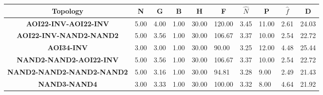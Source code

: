 \documentclass[conference]{IEEEtran}
\begin{document}
\begin{table*}[t]
\center
\begin{tabular}{|c|l|l|l|l|l|l|l|l|l|}
\hline
\textbf{Topology}                & \multicolumn{1}{c|}{\textbf{N}} & \multicolumn{1}{c|}{\textbf{G}} & \multicolumn{1}{c|}{\textbf{B}} & \multicolumn{1}{c|}{\textbf{H}} & \multicolumn{1}{c|}{\textbf{F}} & \multicolumn{1}{c|}{\boldmath$\hat{N}$} & \multicolumn{1}{c|}{\textbf{P}} & \multicolumn{1}{c|}{\boldmath$\hat{f}$} & \multicolumn{1}{c|}{\textbf{D}} \\ \hline
\textbf{AOI22-INV-AOI22-INV}     & 5.00                            & 4.00                            & 1.00                            & 30.00                           & 120.00                          & 3.45                               & 11.00                           & 2.61                               & 24.03                           \\ \hline
\textbf{AOI22-INV-NAND2-NAND2}   & 5.00                            & 3.56                            & 1.00                            & 30.00                           & 106.67                          & 3.37                               & 10.00                           & 2.54                               & 22.72                           \\ \hline
\textbf{AOI34-INV}               & 3.00                            & 3.00                            & 1.00                            & 30.00                           & 90.00                           & 3.25                               & 12.00                           & 4.48                               & 25.44                           \\ \hline
\textbf{NAND2-NAND2-AOI22-INV}   & 5.00                            & 3.56                            & 1.00                            & 30.00                           & 106.67                          & 3.37                               & 10.00                           & 2.54                               & 22.72                           \\ \hline
\textbf{NAND2-NAND2-NAND2-NAND2} & 5.00                            & 3.16                            & 1.00                            & 30.00                           & 94.81                           & 3.28                               & 9.00                            & 2.49                               & 21.43                           \\ \hline
\textbf{NAND3-NAND4}             & 3.00                            & 3.33                            & 1.00                            & 30.00                           & 100.00                          & 3.32                               & 8.00                            & 4.64                               & 21.92                           \\ \hline

\end{tabular}
\end{table*}
\end{document}
